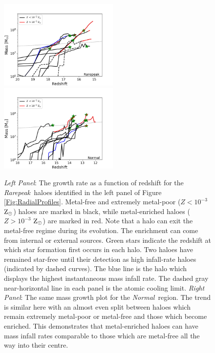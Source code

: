 \documentclass[twocolumn,iop,revtex4]{openjournal}
\newcommand{\zsolarc} {$\rm{Z_{\odot}}$}
\newcommand{\rarepeak} {\textit{Rarepeak~}}
\newcommand{\normal} {\textit{Normal~}}
\begin{document}
\begin{figure}
\centering
\begin{minipage}{175mm}      \begin{center} 
\centerline{
\includegraphics[width=0.525\textwidth]{FIGURES/Rarepeak_MassRedshift.png}
\includegraphics[width=0.525\textwidth]{FIGURES/Normal_MassRedshift.png}}
\caption{\textit{Left Panel}: The growth rate as a function of redshift for the \rarepeak haloes
  identified in the left
  panel of Figure \ref{Fig:RadialProfiles}. Metal-free and extremely metal-poor ($Z < 10^{-3}$
  \zsolarc) haloes are marked in black, while metal-enriched haloes ($Z > 10^{-3}$ \zsolarc) are
  marked in red. Note that a halo can exit the metal-free regime during its evolution. The
  enrichment can come from internal or external sources. Green stars indicate the redshift at
  which star formation first occurs in each halo. Two haloes have remained star-free until their
  detection as high infall-rate haloes (indicated by dashed curves). The blue line is the halo which displays the
  highest instantaneous mass infall rate. 
  The dashed gray near-horizontal line in each panel is the atomic cooling limit.
  \textit{Right Panel}: The same mass growth plot for the \normal region. The trend is similar
  here with an almost even split between haloes which remain extremely metal-poor or metal-free and
  those which become enriched. This demonstrates that metal-enriched haloes can have
  mass infall rates comparable to those which are metal-free all the way into their centre. 
}\label{Fig:GrowthRates}
\end{center} \end{minipage}

\end{figure}
\end{document}
